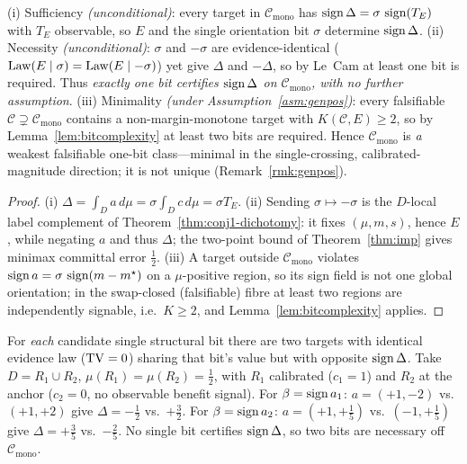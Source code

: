 \begin{theorem}\label{thm:cmono-weakest}
\textnormal{(i) Sufficiency \emph{(unconditional)}:} every target in $\mathcal C_{\mathrm{mono}}$ has
$\operatorname{sign}\Delta=\sigma\,\operatorname{sign}(T_E)$ with $T_E$ observable, so $E$ and the single orientation bit
$\sigma$ determine $\operatorname{sign}\Delta$.
\textnormal{(ii) Necessity \emph{(unconditional)}:} $\sigma$ and $-\sigma$ are evidence-identical
($\mathrm{Law}(E\mid\sigma)=\mathrm{Law}(E\mid-\sigma)$) yet give $\Delta$ and $-\Delta$, so by Le~Cam at least
one bit is required. Thus \emph{exactly one bit certifies $\operatorname{sign}\Delta$ on
$\mathcal C_{\mathrm{mono}}$, with no further assumption}.
\textnormal{(iii) Minimality \emph{(under Assumption~\ref{asm:genpos})}:} every falsifiable
$\mathcal C\supsetneq\mathcal C_{\mathrm{mono}}$ contains a non-margin-monotone target with
$K(\mathcal C,E)\ge2$, so by Lemma~\ref{lem:bitcomplexity} at least two bits are required. Hence
$\mathcal C_{\mathrm{mono}}$ is \emph{a} weakest falsifiable one-bit class---minimal in the
single-crossing, calibrated-magnitude direction; it is not unique (Remark~\ref{rmk:genpos}).
\end{theorem}
\begin{proof}
(i) $\Delta=\int_D a\,d\mu=\sigma\int_D c\,d\mu=\sigma T_E$. (ii) Sending $\sigma\mapsto-\sigma$ is
the $D$-local label complement of Theorem~\ref{thm:conj1-dichotomy}: it fixes $(\mu,m,s)$, hence
$E$, while negating $a$ and thus $\Delta$; the two-point bound of Theorem~\ref{thm:imp} gives
minimax committal error $\tfrac12$. (iii) A target outside $\mathcal C_{\mathrm{mono}}$ violates
$\operatorname{sign} a=\sigma\,\operatorname{sign}(m-m^\star)$ on a $\mu$-positive region, so its sign field is not one global
orientation; in the swap-closed (falsifiable) fibre at least two regions are independently
signable, i.e.\ $K\ge2$, and Lemma~\ref{lem:bitcomplexity} applies.
\end{proof}

\begin{proposition}\label{prop:cmono-witness}
For \emph{each} candidate single structural bit there are two targets with identical evidence law
($\mathrm{TV}=0$) sharing that bit's value but with opposite $\operatorname{sign}\Delta$. Take $D=R_1\cup R_2$,
$\mu(R_1)=\mu(R_2)=\tfrac12$, with $R_1$ calibrated ($c_1{=}1$) and $R_2$ at the anchor
($c_2{=}0$, no observable benefit signal). For $\beta=\operatorname{sign} a_1$: $a=(+1,-2)$ vs.\ $(+1,+2)$ give
$\Delta=-\tfrac12$ vs.\ $+\tfrac32$. For $\beta=\operatorname{sign} a_2$: $a=(+1,+\tfrac15)$ vs.\
$(-1,+\tfrac15)$ give $\Delta=+\tfrac35$ vs.\ $-\tfrac25$. No single bit certifies $\operatorname{sign}\Delta$,
so two bits are necessary off $\mathcal C_{\mathrm{mono}}$.
\end{proposition}

